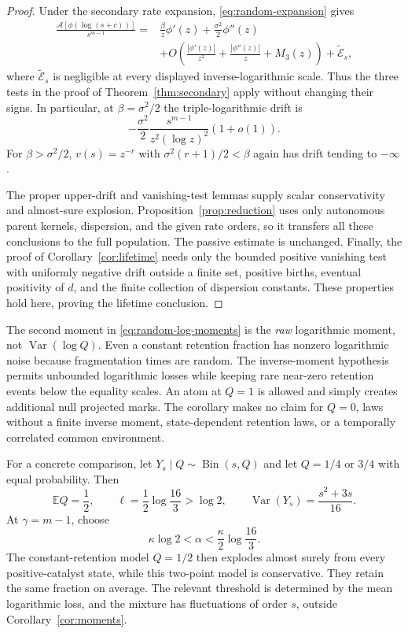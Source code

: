 \documentclass[11pt,a4paper]{article}
\theoremstyle{remark}\newtheorem{remark}[theorem]{Remark}
\DeclareMathOperator{\Var}{Var}
\newcommand{\E}{\mathbb E}
\newcommand{\A}{\mathcal A}
\begin{document}
\begin{proof}
Under the secondary rate expansion, \eqref{eq:random-expansion} gives
\begin{align*}
\frac{\A[\phi(\log(s+c))]}{s^{m-1}}
={}&\frac{\beta}{z}\phi'(z)+\frac{\sigma^2}{2}\phi''(z)\\
&+O\left(\frac{|\phi'(z)|}{z^2}
       +\frac{|\phi''(z)|}{z}+M_3(z)\right)
       +\widetilde{\mathcal E}_s,
\end{align*}
where $\widetilde{\mathcal E}_s$ is negligible at every displayed inverse-logarithmic scale. Thus the three tests in the proof of Theorem~\ref{thm:secondary} apply without changing their signs. In particular, at $\beta=\sigma^2/2$ the triple-logarithmic drift is
\[
-\frac{\sigma^2}{2}
 \frac{s^{m-1}}{z^2(\log z)^2}(1+o(1)).
\]
For $\beta>\sigma^2/2$, $v(s)=z^{-r}$ with
$\sigma^2(r+1)/2<\beta$ again has drift tending to $-\infty$.

The proper upper-drift and vanishing-test lemmas supply scalar conservativity and almost-sure explosion. Proposition~\ref{prop:reduction} uses only autonomous parent kernels, dispersion, and the given rate orders, so it transfers all these conclusions to the full population. The passive estimate is unchanged. Finally, the proof of Corollary~\ref{cor:lifetime} needs only the bounded positive vanishing test with uniformly negative drift outside a finite set, positive births, eventual positivity of $d$, and the finite collection of dispersion constants. These properties hold here, proving the lifetime conclusion.
\end{proof}

The second moment in \eqref{eq:random-log-moments} is the \emph{raw} logarithmic moment, not $\Var(\log Q)$. Even a constant retention fraction has nonzero logarithmic noise because fragmentation times are random. The inverse-moment hypothesis permits unbounded logarithmic losses while keeping rare near-zero retention events below the equality scales. An atom at $Q=1$ is allowed and simply creates additional null projected marks. The corollary makes no claim for $Q=0$, laws without a finite inverse moment, state-dependent retention laws, or a temporally correlated common environment.

For a concrete comparison, let $Y_s\mid Q\sim\operatorname{Bin}(s,Q)$ and let $Q=1/4$ or $3/4$ with equal probability. Then
\[
\E Q=\frac12,\qquad
\ell=\frac12\log\frac{16}{3}>\log2,\qquad
\Var(Y_s)=\frac{s^2+3s}{16}.
\]
At $\gamma=m-1$, choose
\[
\kappa\log2<\alpha<\frac{\kappa}{2}\log\frac{16}{3}.
\]
The constant-retention model $Q=1/2$ then explodes almost surely from every positive-catalyst state, while this two-point model is conservative. They retain the same fraction on average. The relevant threshold is determined by the mean logarithmic loss, and the mixture has fluctuations of order $s$, outside Corollary~\ref{cor:moments}.
\end{document}
